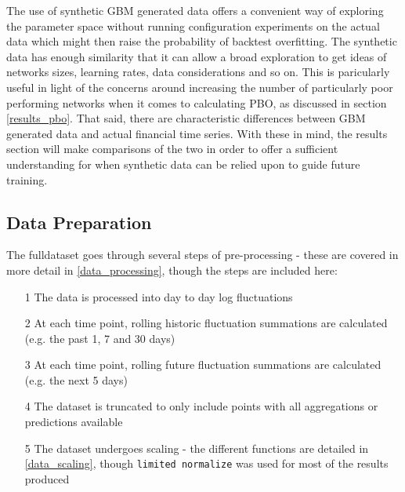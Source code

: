 \documentclass[a4paper,11pt,oneside]{article}
\theoremstyle{plain}
\theoremstyle{definition}
\begin{document}
The use of synthetic GBM generated data offers a convenient way of exploring the parameter space without running configuration experiments on the actual data which might then raise the probability of backtest overfitting. The synthetic data has enough similarity that it can allow a broad exploration to get ideas of networks sizes, learning rates, data considerations and so on. This is paricularly useful in light of the concerns around increasing the number of particularly poor performing networks when it comes to calculating PBO, as discussed in section \ref{results_pbo}. That said, there are characteristic differences between GBM generated data and actual financial time series. With these in mind, the results section will make comparisons of the two in order to offer a sufficient understanding for when synthetic data can be relied upon to guide future training.

\subsection{Data Preparation}\label{proc_dataprep}

The fulldataset goes through several steps of pre-processing - these are covered in more detail in \ref{data_processing}, though the steps are included here:

	\begin{itemize}
	\item[1] The data is processed into day to day log fluctuations
	\item[2] At each time point, rolling historic fluctuation summations are calculated (e.g. the past 1, 7 and 30 days)
	\item[3] At each time point, rolling future fluctuation summations are calculated (e.g. the next 5 days)
	\item[4] The dataset is truncated to only include points with all aggregations or predictions available
	\item[5] The dataset undergoes scaling - the different functions are detailed in \ref{data_scaling}, though \texttt{limited normalize} was used for most of the results produced
\end{itemize}
\end{document}
